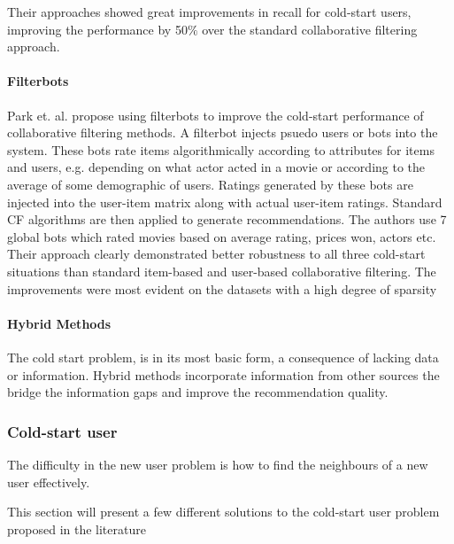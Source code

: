 Their approaches showed great improvements in recall for cold-start users,
improving the performance by 50$\%$ over the standard collaborative filtering
approach.


\paragraph{Filterbots}


Park et. al. \cite{Park2006} propose using filterbots to improve the cold-start
performance of collaborative filtering methods. A filterbot injects psuedo
users or bots into the system. These bots rate items algorithmically according
to attributes for items and users, e.g. depending on what actor acted in a
movie or according to the average of some demographic of users. Ratings
generated by these bots are injected into the user-item matrix along with
actual user-item ratings. Standard CF algorithms are then applied to generate
recommendations. The authors use 7 global bots which rated movies based on
average rating, prices won, actors etc. Their approach clearly demonstrated
better robustness to all three cold-start situations than standard item-based
and user-based collaborative filtering. The improvements were most evident on
the datasets with a high degree of sparsity

\paragraph{Hybrid Methods}

The cold start problem, is in its most basic form, a consequence of lacking
data or information. Hybrid methods incorporate information from other sources
the bridge the information gaps and improve the recommendation quality.

\subsubsection{Cold-start user}


The difficulty in the new user problem is how to find the neighbours of a new
user effectively.

This section will present a few different solutions to the cold-start user
problem proposed in the literature

